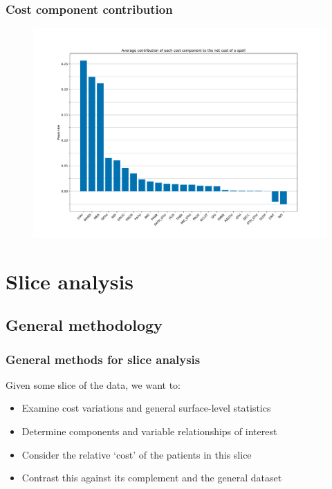 \documentclass{beamer}
\begin{document}
\begin{frame}
    \frametitle{Cost component contribution}

    \begin{figure}
        \includegraphics[width=\linewidth]{./img/cost_contribution.pdf}
    \end{figure}
\end{frame}


\section{Slice analysis}

\subsection{General methodology}

\begin{frame}
    \frametitle{General methods for slice analysis}

    Given some slice of the data, we want to:
    \begin{itemize}
        \item Examine cost variations and general surface-level statistics
        \item Determine components and variable relationships of interest
        \item Consider the relative `cost' of the patients in this slice
        \item Contrast this against its complement and the general dataset
    \end{itemize}
\end{frame}
\end{document}
